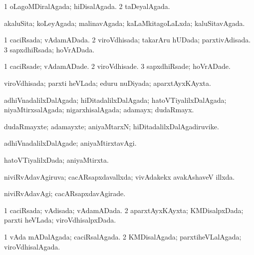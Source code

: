 {\bentry
{} 
\gl{\gu}
\expl{}
\bmng
\bnum
\num{1} oLagoMDiralAgada; hiDisalAgada. 
\num{2} taDeyalAgada. 
\enum
\emng
\eentry

\bentry
{} 
\gl{\gu}
\expl{}
\bmng
 akaluSita; koLeyAgada; malinavAgada; kaLaMkitagoLaLxda; kaluSitavAgada. 
\emng
\eentry

\bentry
{} 
\gl{\gu}
\expl{}
\bmng
\bnum
\num{1} caciRsada; vAdamADada. 
\num{2} viroVdhisada; takarAru hUDada; parxtivAdisada. 
\num{3} sapxdhiRsada; hoVrADada. 
\enum
\emng
\eentry

\bentry
{} 
\gl{\kirxvi}
\expl{}
\bmng
\bnum
\num{1} caciRsade; vAdamADade. 
\num{2} viroVdhisade. 
\num{3} sapxdhiRsade; hoVrADade. 
\enum
\emng
\eentry

\bentry
{} 
\gl{\gu}
\expl{}
\bmng
 viroVdhisada; parxti heVLada; eduru nuDiyada; aparxtAyxKAyxta. 
\emng
\eentry

\bentry
{} 
\gl{\gu}
\expl{}
\bmng
 adhiVnadalilxDalAgada; hiDitadalilxDalAgada; hatoVTiyalilxDalAgada; niyaMtirxsalAgada; nigarxhisalAgada; adamayx; dudaRmayx. 
\emng
\eentry

\bentry
{} 
\gl{\nA}
\expl{}
\bmng
 dudaRmayxte; adamayxte; aniyaMtarxN; hiDitadalilxDalAgadiruvike. 
\emng
\eentry

\bentry
{} 
\gl{\kirxvi}
\expl{}
\bmng
 adhiVnadalilxDalAgade; aniyaMtirxtavAgi. 
\emng
\eentry

\bentry
{} 
\gl{\gu}
\expl{}
\bmng
hatoVTiyalilxDada; aniyaMtirxta. 
\emng
\eentry

\bentry
{} 
\gl{\gu}
\expl{}
\bmng
 niviRvAdavAgiruva; cacARsapxdavallxda; vivAdakekx avakAshaveV illxda. 
\emng
\eentry

\bentry
{} 
\gl{\kirxvi}
\expl{}
\bmng
 niviRvAdavAgi; cacARsapxdavAgirade. 
\emng
\eentry

\bentry
{} 
\gl{\gu}
\expl{}
\bmng
\bnum
\num{1} caciRsada; vAdisada; vAdamADada. 
\num{2} aparxtAyxKAyxta; KMDisalpxDada; parxti heVLada; viroVdhisalpxDada. 
\enum
\emng
\eentry

\bentry
{} 
\gl{\gu}
\expl{}
\bmng
\bnum
\num{1} vAda mADalAgada; caciRsalAgada. 
\num{2} KMDisalAgada; parxtiheVLalAgada; viroVdhisalAgada. 
\enum
\emng
\eentry

}
